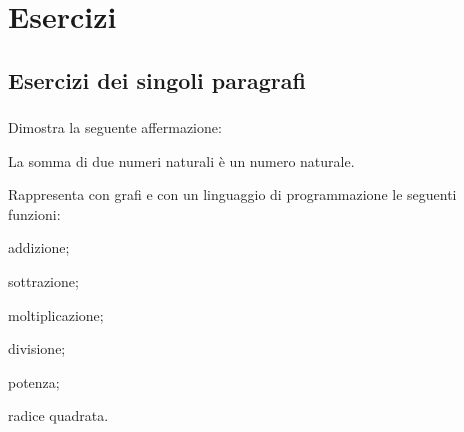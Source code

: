 
\section{Esercizi}

\subsection{Esercizi dei singoli paragrafi}

\subsubsection*{}

\begin{esercizio}
Dimostra la seguente affermazione:
 \begin{enumeratees}
\item La somma di due numeri naturali è un numero naturale.
 \end{enumeratees}
\end{esercizio}

\begin{esercizio}
Rappresenta con grafi e con un linguaggio di programmazione le seguenti
funzioni:
\begin{htmulticols}{3}
 \begin{enumeratees}
 \item addizione; \qquad
 \item sottrazione; \qquad
 \item moltiplicazione; \qquad
 \item divisione; \qquad
 \item potenza; \qquad
 \item radice quadrata.
 \end{enumeratees}
\end{htmulticols}
\end{esercizio}

